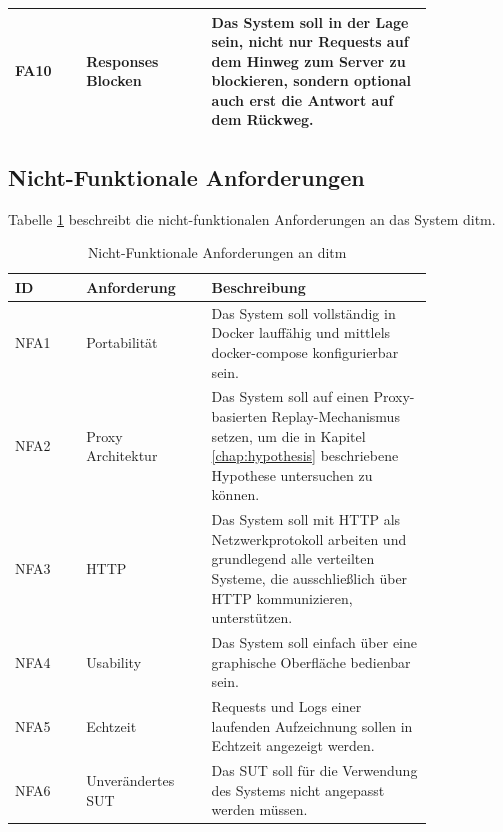 \documentclass[12pt,a4paper]{report}
\begin{document}
\begin{longtable}[H]{|p{}|p{0.3\linewidth}|p{0.53\linewidth}|}
	FA10 & Responses Blocken             & Das System soll in der Lage sein, nicht nur Requests auf dem Hinweg zum Server zu blockieren, sondern optional auch erst die Antwort auf dem Rückweg.                                                                                                                                                                                                                                                     \\ \hline
\end{longtable}

\subsection{Nicht-Funktionale Anforderungen}
Tabelle \ref{tab:nfa} beschreibt die nicht-funktionalen Anforderungen an das System ditm.
\begin{longtable}[H]{|p{}|p{0.3\linewidth}|p{0.53\linewidth}|}
	\caption{Nicht-Funktionale Anforderungen an ditm\label{tab:nfa}}                                                                                                                      \\
	\hline
	ID   & Anforderung       & Beschreibung                                                                                                                                               \\ \hline
	NFA1 & Portabilität      & Das System soll vollständig in Docker lauffähig und mittlels docker-compose konfigurierbar sein.                                                           \\ \hline
	NFA2 & Proxy Architektur & Das System soll auf einen Proxy-basierten Replay-Mechanismus setzen, um die in Kapitel \ref{chap:hypothesis} beschriebene Hypothese untersuchen zu können. \\ \hline
	NFA3 & HTTP              & Das System soll mit HTTP als Netzwerkprotokoll arbeiten und grundlegend alle verteilten Systeme, die ausschließlich über HTTP kommunizieren, unterstützen. \\ \hline
	NFA4 & Usability         & Das System soll einfach über eine graphische Oberfläche bedienbar sein.                                                                                    \\ \hline
	NFA5 & Echtzeit          & Requests und Logs einer laufenden Aufzeichnung sollen in Echtzeit angezeigt werden.                                                                        \\ \hline
	NFA6 & Unverändertes SUT & Das SUT soll für die Verwendung des Systems nicht angepasst werden müssen.                                                                                 \\ \hline
\end{longtable}
\end{document}
